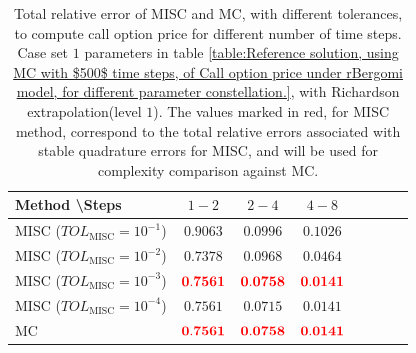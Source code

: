 \begin{table}[!h]
	\centering
	\begin{tabular}{l*{6}{c}r}
		Method \textbackslash  Steps            & $1-2$ & $2-4$ & $4-8$   \\
		\hline
		MISC ($TOL_{\text{MISC}}=10^{-1}$)  & $\mathbf{0.9063
		}$ & $\mathbf{ 0.0996}$ & $\mathbf{  0.1026}$   \\
		MISC ($TOL_{\text{MISC}}=10^{-2}$)  & $\mathbf{0.7378}$ & $\mathbf{  0.0968}$ & $\mathbf{   0.0464}$  \\	
		MISC ($TOL_{\text{MISC}}=10^{-3}$)  & $\mathbf{{\color{red}0.7561}}$ & $\mathbf{{\color{red}0.0758}}$ & $\mathbf{{\color{red}0.0141}}$  \\
		MISC ($TOL_{\text{MISC}}=10^{-4}$)  & $\mathbf{0.7561}$ & $\mathbf{0.0715}$ & $\mathbf{0.0141}$ \\
		\hline
		MC   & $\mathbf{{\color{red}0.7561}}$  & $\mathbf{{\color{red}0.0758}}$  & $\mathbf{{\color{red}0.0141}}$  \\
		
		\hline
	\end{tabular}
	\caption{Total  relative error of MISC and MC, with different tolerances, to compute call option price for different number of time steps. Case set $1$ parameters in table \ref{table:Reference solution, using MC with $500$ time steps, of Call option price under rBergomi model, for different parameter constellation.}, with Richardson extrapolation(level $1$). The values marked in red, for MISC method, correspond to the total relative errors associated with  stable quadrature errors for MISC, and will be used for complexity comparison against MC.}
	\label{Total  error of MISC and MC to compute Call option price of the different tolerances for different number of time steps. Case set $1$ parameters, with Richardson extrapolation(level $1$). The numbers between parentheses are the corresponding absolute errors.}
\end{table}

